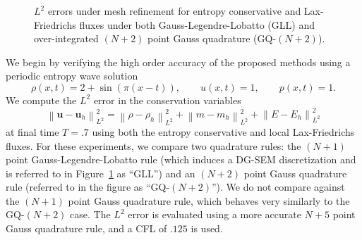 \documentclass[preprint,10pt]{article}
\theoremstyle{definition}
\theoremstyle{lemma}
\theoremstyle{theorem}
\theoremstyle{assumption}
\newcommand{\nor}[1]{\left\| #1 \right\|}
\newcommand{\LRp}[1]{\left( #1 \right)}
\begin{document}
\begin{figure}
{
}
\caption{$L^2$ errors under mesh refinement for entropy conservative and Lax-Friedrichs fluxes under both Gauss-Legendre-Lobatto (GLL) and over-integrated $(N+2)$ point Gauss quadrature (GQ-$(N+2)$).}
\label{fig:convergence}
\end{figure}
We begin by verifying the high order accuracy of the proposed methods using a periodic entropy wave solution
\[
\rho(x,t) = 2 + \sin\LRp{\pi (x - t)}, \qquad u(x,t) = 1, \qquad p(x,t) = 1.
\]
We compute the $L^2$ error in the conservation variables 
\[
\nor{\bm{u} - \bm{u}_h}_{L^2}^2 = \nor{\rho - \rho_h}_{L^2}^2 + \nor{m - m_h}_{L^2}^2 + \nor{E - E_h}_{L^2}^2
\]
at final time $T = .7$ using both the entropy conservative and local Lax-Friedrichs fluxes.  For these experiments, we compare two quadrature rules: the $(N+1)$ point Gauss-Legendre-Lobatto rule (which induces a DG-SEM discretization and is referred to in Figure~\ref{fig:convergence} as ``GLL'') and an $(N+2)$ point Gauss quadrature rule (referred to in the figure as ``GQ-$(N+2)$'').  We do not compare against the $(N+1)$ point Gauss quadrature rule, which behaves very similarly to the GQ-$(N+2)$ case.  The $L^2$ error is evaluated using a more accurate $N+5$ point Gauss quadrature rule, and a CFL of $.125$ is used.  
\end{document}
